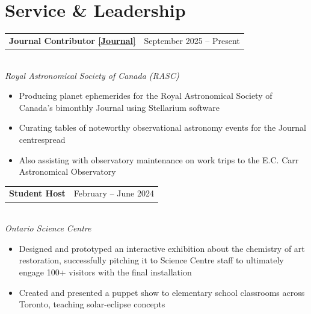 \documentclass[letterpaper,10pt]{article}
\makeatletter
\newcommand{\heading}[2]{\begin{tabular*}{\textwidth}{l@{\extracolsep{\fill}}r}\textbf{#1} & #2\end{tabular*}}
\makeatother
\begin{document}
\section{Service \& Leadership}\vspace{3pt}\heading{Journal Contributor \href{https://www.rasc.ca/node/47054}{\textnormal{\underline{[Journal]}}}}{September 2025 -- Present}\\[-1pt]
{\small\textit{Royal Astronomical Society of Canada (RASC)}}
\begin{itemize}\small
\item Producing planet ephemerides for the Royal Astronomical Society of Canada's bimonthly Journal using Stellarium software
\item Curating tables of noteworthy observational astronomy events for the Journal centrespread
\item Also assisting with observatory maintenance on work trips to the E.C. Carr Astronomical Observatory
\end{itemize}
\vspace{3pt}\heading{Student Host}{February -- June 2024}\\[-1pt]
{\small\textit{Ontario Science Centre}}
\begin{itemize}\small
\item Designed and prototyped an interactive exhibition about the chemistry of art restoration, successfully pitching it to Science Centre staff to ultimately engage 100+ visitors with the final installation
\item Created and presented a puppet show to elementary school classrooms across Toronto, teaching solar-eclipse concepts
\end{itemize}
\end{document}
